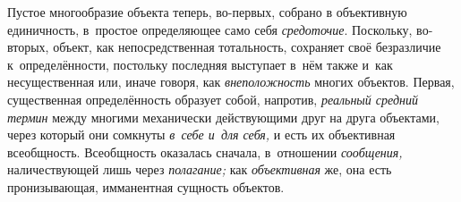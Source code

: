 
Пустое многообразие объекта теперь, во-первых, собрано в
объективную единичность, в~простое определяющее само себя
{\em средоточие}.
Поскольку, во-вторых, объект, как непосредственная
тотальность, сохраняет своё безразличие к~определённости, постольку
последняя выступает в~нём также и~как несущественная или, иначе говоря, как
{\em внеположность}
многих объектов. Первая, существенная определённость образует
собой, напротив, {\em реальный средний
термин} между многими механически действующими друг на друга
объектами, через который они сомкнуты
{\em в~себе и~для себя,}
и есть их объективная всеобщность. Всеобщность оказалась
сначала, в~отношении {\em сообщения,}
наличествующей лишь через
{\em полагание;} как
{\em объективная} же, она
есть пронизывающая, имманентная сущность объектов.

